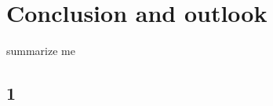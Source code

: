 \chapter{Conclusion and outlook}
\label{sec:conclusion}

\begin{summary}
summarize me
\end{summary}

\section{1}
\label{sec:conclusion:1}
